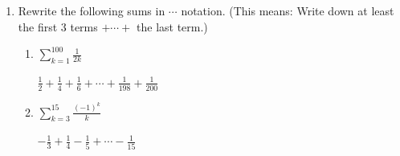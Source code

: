 \documentclass[main]{subfiles}
\begin{document}
\begin{enumerate}
\begin{solution}
  Also note that although this is the degree 15 Taylor polynomial, it only has 8 terms (since the other 7 terms had coefficients of 0). This indicates that the \textit{degree} of a polynomial is different than the \textit{number of terms} in a polynomial.
  \end{solution}

   \pspace{\newpage}
  
  \item 
  Rewrite the following sums in $\cdots$
  notation.  (This means: Write down at least the first 3 terms $+ \cdots
  + $ the last term.)

  \begin{enumerate}
    \item

    
    \begin{problem}[\vfill]
    $\displaystyle \sum_{k=1}^{100} \frac{1}{2k}$
    \end{problem}

    \begin{solution}
    $\displaystyle \frac{1}{2} + \frac{1}{4} + \frac{1}{6} + \cdots +
    \frac{1}{198} + \frac{1}{200}$
    \end{solution}

    \item

    
    \begin{problem}[\vfill]
    $\displaystyle \sum_{k=3}^{15} \frac{(-1)^k}{k}$
    \end{problem}

    \begin{solution}
    $\displaystyle -\frac{1}{3} + \frac{1}{4} - \frac{1}{5} + \cdots -
    \frac{1}{15}$
    \end{solution}


\end{enumerate}
\end{enumerate}
\end{document}
